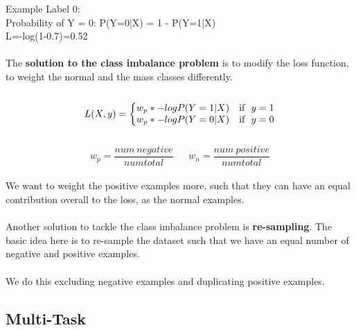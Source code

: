 \documentclass[a4paper,12pt]{article}
\begin{document}
Example Label 0:\\
Probability of Y = 0: P(Y=0|X) = 1 - P(Y=1|X)\\
L=-log(1-0.7)=0.52
\\
\\
The \textbf{solution to the class imbalance problem} is to modify the loss function, to weight the normal and the mass classes differently. 
\\\\
\begin{equation}
L(X,y)=\left\{
\begin{array}{@{}ll@{}}
w_p * -log P(Y=1|X) & \text{if}\ \ y=1 \nonumber \\
w_p * -log P(Y=0|X) & \text{if}\ \ y=0
\end{array}\right.
\end{equation}
\\
\[ w_p=\frac{num\ negative}{num total} \ \ \textrm{ }
\ \ w_n=\frac{num\ positive}{num total} \]
\\
We want to weight the positive examples more, such that they can have an equal contribution overall to the loss, as the normal examples.\\
\\
Another solution to tackle the class imbalance problem is \textbf{re-sampling}. The basic idea here is to re-sample the dataset such that we have an equal number of negative and positive examples.\\
\\
We do this excluding negative examples and duplicating positive examples.

\subsection{Multi-Task}
\end{document}
